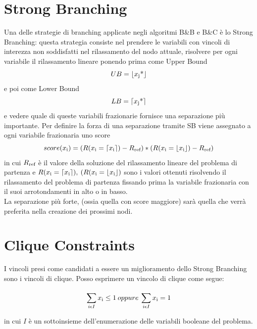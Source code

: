 \documentclass[12pt,a4paper,twoside,openright]{book}
\begin{document}
\section{Strong Branching}
Una delle strategie di branching applicate negli algoritmi B\&B e B\&C è lo Strong Branching:
questa strategia consiste nel prendere le variabili con vincoli di interezza non soddisfatti
nel rilassamento del nodo attuale, risolvere per ogni variabile il rilassamento lineare
ponendo prima come Upper Bound \[UB = \lfloor x \textsubscript{j} \textup{*} \rfloor\] e poi come Lower Bound 
\[LB = \lceil x \textsubscript{j} \textup{*} \rceil\] e vedere quale di queste variabili frazionarie
fornisce una separazione più importante. Per definire la forza di una separazione tramite SB viene assegnato
a ogni variabile frazionaria uno score 
\[score(x\textsubscript{i}) = 
(R(x\textsubscript{i} = \lceil x\textsubscript{i} \rceil)-R\textsubscript{ref})*(R(x\textsubscript{i} = \lfloor x\textsubscript{i} \rfloor) - R\textsubscript{ref})  \]
in cui $R\textsubscript{ref}$ è il valore della soluzione del rilassamento lineare del problema di partenza
e $R(x\textsubscript{i} = \lceil x\textsubscript{i} \rceil),\:(R(x\textsubscript{i} = \lfloor x\textsubscript{i} \rfloor) $ sono i valori ottenuti risolvendo
il rilassamento del problema di partenza fissando prima la variabile frazionaria con il suoi arrotondamenti in alto
o in basso. \\La separazione più forte, (ossia quella con score maggiore) sarà quella che verrà preferita nella creazione dei prossimi nodi.

\section{Clique Constraints}
I vincoli presi come candidati a essere un miglioramento dello Strong Branching sono i 
vincoli di clique. Posso esprimere un vincolo di clique come segue:

    \[ \sum\limits_{i \epsilon I}^{} x\textsubscript{i} \leq 1 \:  oppure \: \sum\limits_{i \epsilon I}^{} x\textsubscript{i} = 1 \]

in cui $I$ è un sottoinsieme dell'enumerazione delle
variabili booleane del problema.
\end{document}

